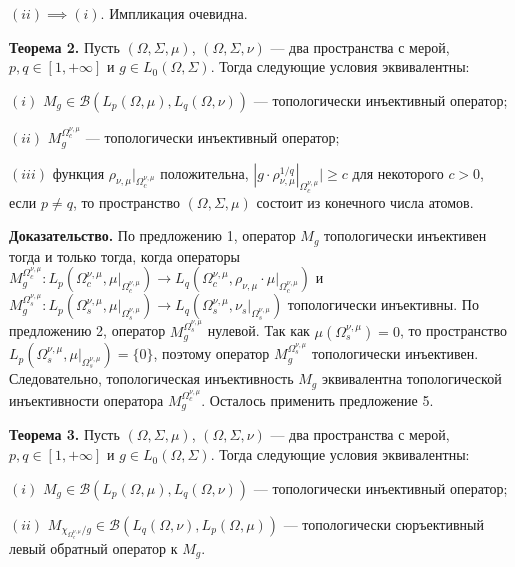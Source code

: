 \documentclass[11pt,twoside]{article}
\begin{document}
$(ii)$$\implies$$ (i)$. Импликация очевидна.


\textbf{Теорема 2.} Пусть $(\Omega,\Sigma,\mu)$, $(\Omega,\Sigma,\nu)$
--- два пространства с мерой, $p,q\in[1,+\infty]$ и $g\in
L_0(\Omega,\Sigma)$. Тогда следующие условия эквивалентны:

$(i)$ $M_g\in\mathcal{B}(L_p(\Omega,\mu), L_q(\Omega,\nu))$ ---
топологически инъективный оператор;

$(ii)$ $M_g^{\Omega_c^{\nu,\mu}}$ --- топологически инъективный оператор;

$(iii)$ функция $\rho_{\nu,\mu}|_{\Omega_c^{\nu,\mu}}$ положительна,
$|g\cdot\rho_{\nu,\mu}^{1/q}|_{\Omega_c^{\nu,\mu}}|\geq c$ для некоторого
$c>0$, если $p\neq q$, то пространство $(\Omega,\Sigma,\mu)$ состоит из
конечного числа атомов.

\textbf{Доказательство.} По предложению 1, оператор $M_g$ топологически
инъективен тогда и только тогда, когда операторы
$M_g^{\Omega_c^{\nu,\mu}}:
L_p(\Omega_c^{\nu,\mu},\mu|_{\Omega_c^{\nu,\mu}})
\to
L_q(\Omega_c^{\nu,\mu},\rho_{\nu,\mu}\cdot\mu|_{\Omega_c^{\nu,\mu}})$ и
$M_g^{\Omega_s^{\nu,\mu}}:
L_p(\Omega_s^{\nu,\mu},\mu|_{\Omega_s^{\nu,\mu}})
\to
L_q(\Omega_s^{\nu,\mu},\nu_s|_{\Omega_s^{\nu,\mu}})$ топологически
инъективны. По предложению 2, оператор $M_g^{\Omega_s^{\nu,\mu}}$
нулевой. Так как $\mu(\Omega_s^{\nu,\mu})=0$, то пространство
$L_p(\Omega_s^{\nu,\mu},\mu|_{\Omega_s^{\nu,\mu}})=\{0\}$, поэтому
оператор $M_g^{\Omega_s^{\nu,\mu}}$ топологически инъективен.
Следовательно, топологическая инъективность $M_g$ эквивалентна
топологической инъективности оператора  $M_g^{\Omega_c^{\nu,\mu}}$.
Осталось применить предложение 5.

\textbf{Теорема 3.} Пусть $(\Omega,\Sigma,\mu)$, $(\Omega,\Sigma,\nu)$
--- два пространства с мерой, $p,q\in[1,+\infty]$ и $g\in
L_0(\Omega,\Sigma)$. Тогда следующие условия эквивалентны:

$(i)$ $M_g\in\mathcal{B}(L_p(\Omega,\mu),L_q(\Omega,\nu))$ --- топологически
инъективный оператор;

$(ii)$ $M_{\chi_{\Omega_c^{\nu,\mu}}/g}\in\mathcal{B}(L_q(\Omega,\nu),
L_p(\Omega,\mu))$ --- топологически сюръективный левый обратный оператор к
$M_g$.
\end{document}
